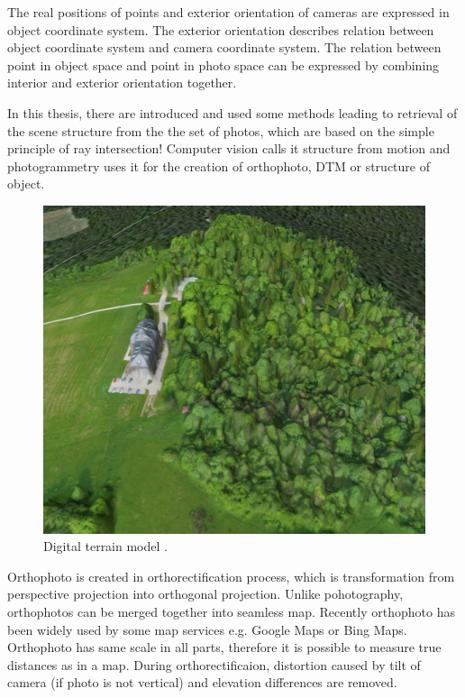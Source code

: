 \documentclass[a4paper,12pt]{article}
\begin{document}
The real positions of points and exterior orientation of cameras are expressed in object coordinate system. 
The exterior orientation describes relation between object coordinate system and camera coordinate system. 
The relation between point in object 
space and point in photo space can be expressed by combining interior and exterior orientation together.

In this thesis, there are introduced and used  some methods leading to retrieval of the scene structure from the 
the set of photos, which are based on the simple principle of ray intersection! Computer vision calls it structure from motion 
and photogrammetry uses it for the creation of orthophoto, DTM or structure of object.


\begin{figure}[h]
    \centering
    \includegraphics[scale=0.3]{figures/dtm.jpg}
    \caption{Digital terrain model \cite{kbosak2010bezmiechowa}.}
\end{figure}


Orthophoto is created in 
orthorectification process, which is transformation from perspective projection into orthogonal projection.
Unlike pohotography, orthophotos can be merged together into seamless map. Recently 
orthophoto has been widely used by some map services e.g. Google Maps or Bing Maps. Orthophoto 
has same scale in all parts, therefore it is possible to measure true distances as in a map. During orthorectificaion, distortion 
caused by tilt of camera (if photo is not vertical) and elevation differences are removed.
\end{document}
